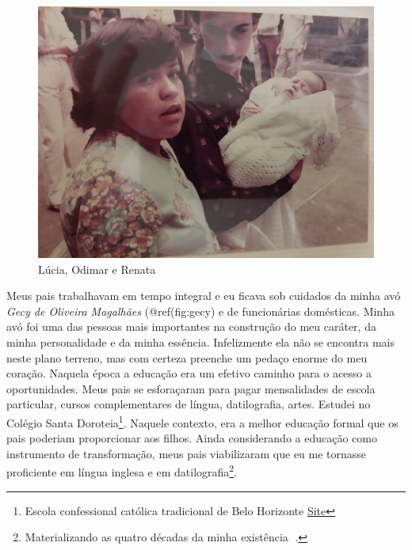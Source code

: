 \documentclass[
]{book}
\begin{document}
\begin{figure}
\centering
\includegraphics{img/pais.jpg}
\caption{Lúcia, Odimar e Renata}
\end{figure}

Meus pais trabalhavam em tempo integral e eu ficava sob cuidados da
minha avó \emph{Gecy de Oliveira Magalhães} (@ref(fig:gecy) e de
funcionárias domésticas. Minha avó foi uma das pessoas mais importantes
na construção do meu caráter, da minha personalidade e da minha
essência. Infelizmente ela não se encontra mais neste plano terreno, mas
com certeza preenche um pedaço enorme do meu coração. Naquela época a
educação era um efetivo caminho para o acesso a oportunidades. Meus pais
se esforaçaram para pagar mensalidades de escola particular, cursos
complementares de língua, datilografia, artes. Estudei no Colégio Santa
Doroteia\footnote{Escola confessional católica tradicional de Belo
  Horizonte \href{https://santadoroteia.com.br}{Site}}. Naquele
contexto, era a melhor educação formal que os pais poderiam proporcionar
aos filhos. Ainda considerando a educação como instrumento de
transformação, meus pais viabilizaram que eu me tornasse proficiente em
língua inglesa e em datilografia\footnote{Materializando as quatro
  décadas da minha existência 🥰.}.
\end{document}
